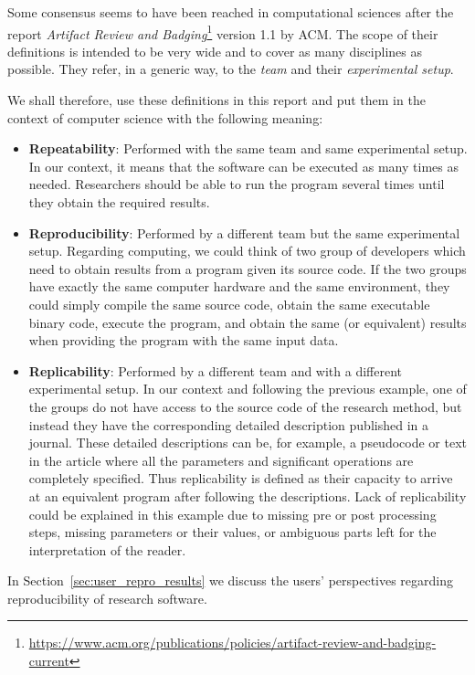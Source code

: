 Some consensus seems to have been reached in computational sciences after the report \textit{Artifact Review and Badging}\footnote{\url{https://www.acm.org/publications/policies/artifact-review-and-badging-current}} version 1.1 by ACM. The scope of their definitions is intended to be very wide and to cover as many disciplines as possible. They refer, in a generic way, to the \textit{team} and their \textit{experimental setup}.

We shall therefore, use these definitions in this report and put them in the context of computer science with the following meaning:

\begin{itemize}
    \item \textbf{Repeatability}: Performed with the same team and same experimental setup. In our context, it means that the software can be executed as many times as needed. Researchers should be able to run the program several times until they obtain the required results.
    
    \item \textbf{Reproducibility}: Performed by a different team but the same experimental setup. Regarding computing, we could think of two group of developers which need to obtain results from a program given its source code. If the two groups have exactly the same computer hardware and the same environment, they could simply compile the same source code, obtain the same executable binary code, execute the program, and obtain the same (or equivalent) results when providing the program with the same input data.

    \item \textbf{Replicability}: Performed by a different team and with a different experimental setup. In our context and following the previous example, one of the groups do not have access to the source code of the research method, but instead they have the corresponding detailed description published in a journal. These detailed descriptions can be, for example, a pseudocode or text in the article where all the parameters and significant operations are completely specified. Thus replicability is defined as their capacity to arrive at an equivalent program after following the descriptions. Lack of replicability could be explained in this example due to missing pre or post processing steps, missing parameters or their values, or ambiguous parts left for the interpretation of the reader.
\end{itemize}

In Section~\ref{sec:user_repro_results} we discuss the users' perspectives regarding reproducibility of research software.

